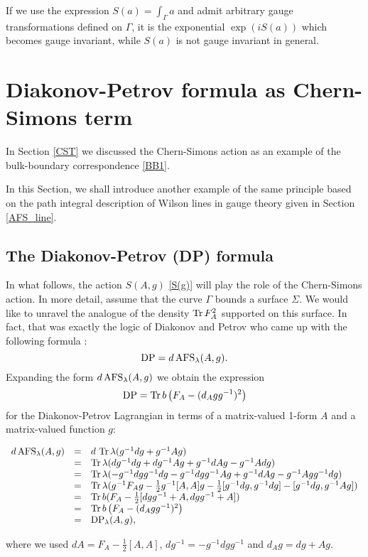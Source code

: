 \documentclass[11pt]{report}
\theoremstyle{plain}
\theoremstyle{definition}
\theoremstyle{remark}
\theoremstyle{remark}
\numberwithin{equation}{section}
\begin{document}
If we use the expression $S(a)=\int_\Gamma a$ and admit arbitrary gauge transformations defined on $\Gamma$, it is the exponential $\exp(iS(a))$ which becomes gauge invariant, while $S(a)$ is not gauge invariant in general.

\section{Diakonov-Petrov formula as Chern-Simons term}



In Section \ref{CST} we discussed the Chern-Simons action  as an example of the bulk-boundary correspondence \eqref{BB1}.

In this Section, we shall introduce another example of the same principle based on the path integral description of Wilson lines in gauge theory given in Section \ref{AFS_line}. 


\subsection{The Diakonov-Petrov (DP) formula}
In what follows, the action $S(A,g)$ \eqref{S(g)} will play the role of the Chern-Simons action. In more detail, assume that the curve $\Gamma$ bounds a surface $\Sigma$. We would like to unravel the analogue of the density ${\rm Tr}\, F_A^2$ supported on this surface. In fact, that was exactly the logic of Diakonov and Petrov who came up with the following formula \cite{DP}:
%
\begin{equation}
{\rm DP} = d \, {\rm AFS}_\lambda(A,g).
\end{equation}
Expanding the form $d \, {\rm AFS}_\lambda(A,g)$ we obtain the expression 
\begin{equation}\label{DPL}
{\rm DP} = {\rm Tr} \, b \left( F_A - (d_A g g^{-1})^2 \right)
\end{equation}
for the Diakonov-Petrov Lagrangian in terms of  a matrix-valued 1-form $A$ and a matrix-valued function $g$:

%
\begin{spacing}{1.45}
$
\begin{array}{lll} 
d \, {\rm AFS}_\lambda(A,g) & = & d\,\, {\rm Tr} \, \lambda(g^{-1} dg + g^{-1} A g) \\
& = & {\rm Tr} \, \lambda(d g^{-1} dg + d g^{-1} Ag + g^{-1} dA g - g^{-1} A dg) \\ 
& = & {\rm Tr} \, \lambda (-g^{-1} dg g^{-1} dg - g^{-1} dg g^{-1} Ag + g^{-1} dA g - g^{-1} Ag g^{-1} dg) \\
& = & {\rm Tr} \, \lambda (g^{-1} F_A g - \frac{1}{2} g^{-1}[A,A] g - \frac{1}{2} [g^{-1} dg , g^{-1} dg] - [g^{-1} dg , g^{-1} Ag]) \\
& = & {\rm Tr} \, b ( F_A - \frac{1}{2} [dg g^{-1} + A , dg g^{-1} + A] ) \\
& = & {\rm Tr} \, b \left( F_A - (d_A g g^{-1})^2 \right) \\
& = & {\rm DP}_\lambda(A,g),
\end{array}
$
\end{spacing}
where we used $dA = F_A - \frac{1}{2} [A,A]$, $dg^{-1} = -g^{-1} dg g^{-1}$ and $d_A g = dg + Ag$.
\end{document}
